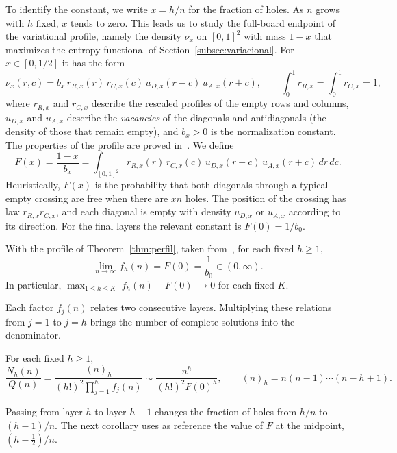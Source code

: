 To identify the constant, we write $x=h/n$ for the fraction of holes. As $n$ grows with $h$ fixed, $x$ tends
to zero. This leads us to
study the full-board endpoint of the variational profile, namely the density $\nu_x$ on $[0,1]^2$ with mass
$1-x$ that maximizes the
entropy functional of Section~\ref{subsec:variacional}. For $x\in[0,1/2]$ it has the form \[
 \nu_x(r,c)=b_x\,r_{R,x}(r)\,r_{C,x}(c)\,u_{D,x}(r-c)\,u_{A,x}(r+c),
 \qquad \int_0^1 r_{R,x}=\int_0^1 r_{C,x}=1,
\] where $r_{R,x}$ and $r_{C,x}$ describe the rescaled profiles of the empty rows and columns, $u_{D,x}$ and
$u_{A,x}$ describe the
\emph{vacancies} of the diagonals and antidiagonals (the density of those that remain empty), and $b_x>0$ is
the normalization
constant. The properties of the profile are proved in~\cite{Perfil}. We define \begin{equation}\label{eq:F}
 F(x)=\frac{1-x}{b_x}=\int_{[0,1]^2}r_{R,x}(r)\,r_{C,x}(c)\,u_{D,x}(r-c)\,u_{A,x}(r+c)\,dr\,dc .
\end{equation} Heuristically, $F(x)$ is the probability that both diagonals through a typical empty crossing
are free when there are
$xn$ holes. The position of the crossing has law $r_{R,x}r_{C,x}$, and each diagonal is empty with density
$u_{D,x}$ or $u_{A,x}$
according to its direction. For the final layers the relevant constant is $F(0)=1/b_0$.

\begin{teorema}\label{thm:limite} With the profile of Theorem~\ref{thm:perfil},
taken
from~\cite{Perfil}, for each fixed $h\ge1$, \[
 \lim_{n\to\infty}f_h(n)=F(0)=\frac1{b_0}\in(0,\infty).
\] In particular, $\max_{1\le h\le K}|f_h(n)-F(0)|\to0$ for each fixed $K$. \end{teorema}

Each factor $f_j(n)$ relates two consecutive layers. Multiplying these relations from $j=1$ to $j=h$ brings
the number of complete
solutions into the denominator.

\begin{corolario}\label{cor:cociente} For each fixed $h\ge1$, \[
 \frac{N_h(n)}{Q(n)}=\frac{(n)_h}{(h!)^2\prod_{j=1}^hf_j(n)}
 \sim\frac{n^h}{(h!)^2F(0)^h},\qquad (n)_h=n(n-1)\cdots(n-h+1).
\] \end{corolario}

Passing from layer $h$ to layer $h-1$ changes the fraction of holes from $h/n$ to $(h-1)/n$. The next
corollary uses as reference
the value of $F$ at the midpoint, $(h-\tfrac12)/n$.

